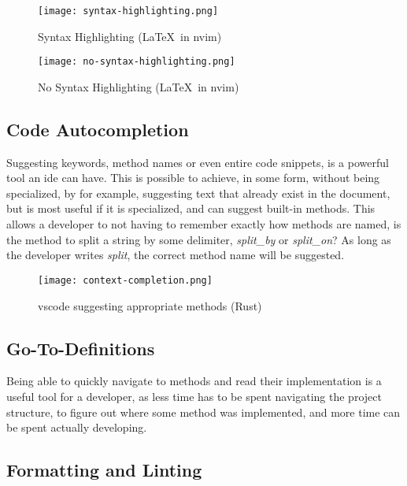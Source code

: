 \begin{figure}
  \centering
  \texttt{[image: syntax-highlighting.png]}
  \caption{Syntax Highlighting (\LaTeX\ in \gls*{nvim})}
  \label{pic:stx}
\end{figure}

\begin{figure}
  \centering
  \texttt{[image: no-syntax-highlighting.png]}
  \caption{No Syntax Highlighting (\LaTeX\ in \gls*{nvim})}
  \label{pic:noStx}
\end{figure}

\subsection{Code Autocompletion}

Suggesting keywords, method names or even entire code snippets, is a powerful
tool an \gls*{ide} can have. This is possible to achieve, in some form, without
being specialized, by for example, suggesting text that already exist in the
document, but is most useful if it is specialized, and can suggest built-in
methods. This allows a developer to not having to remember exactly how methods
are named, is the method to split a string by some delimiter, \textit{split\_by}
or \textit{split\_on}? As long as the developer writes \textit{split}, the
correct method name will be suggested.

\begin{figure}
  \centering
  \texttt{[image: context-completion.png]}
  \caption{\gls*{vscode} suggesting appropriate methods (Rust)}
  \label{pic:completion}
\end{figure}

\subsection{Go-To-Definitions}

Being able to quickly navigate to methods and read their implementation is a
useful tool for a developer, as less time has to be spent navigating the project
structure, to figure out where some method was implemented, and more time can be
spent actually developing.

\subsection{Formatting and Linting}

